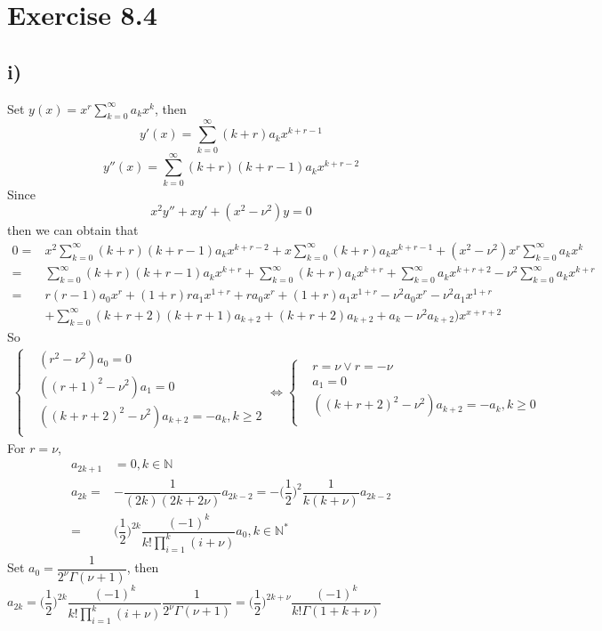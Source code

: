 \documentclass[a4paper,12pt,titlepage]{article}
\begin{document}
\section*{Exercise 8.4}
\subsection*{i)}
Set $y(x)=x^r\sum\limits_{k=0}^{\infty}a_kx^k$, then
$$y'(x)=\sum\limits_{k=0}^{\infty}(k+r)a_kx^{k+r-1}$$
$$y''(x)=\sum\limits_{k=0}^{\infty}(k+r)(k+r-1)a_kx^{k+r-2}$$
Since 
$$x^2y''+xy'+(x^2-\nu^2)y=0$$
then we can obtain that
\begin{align*}
0=&x^2\sum\limits_{k=0}^{\infty}(k+r)(k+r-1)a_kx^{k+r-2}+x\sum\limits_{k=0}^{\infty}(k+r)a_kx^{k+r-1}+(x^2-\nu^2)x^r\sum\limits_{k=0}^{\infty}a_kx^k\\
=&\sum\limits_{k=0}^{\infty}(k+r)(k+r-1)a_kx^{k+r}+\sum\limits_{k=0}^{\infty}(k+r)a_kx^{k+r}+\sum\limits_{k=0}^{\infty}a_kx^{k+r+2}-\nu^2\sum\limits_{k=0}^{\infty}a_kx^{k+r}\\
=&r(r-1)a_0x^r+(1+r)ra_1x^{1+r}+ra_0x^r+(1+r)a_1x^{1+r}-\nu^2a_0x^r-\nu^2a_1x^{1+r}\\
&+\sum\limits_{k=0}^{\infty}(k+r+2)(k+r+1)a_{k+2}+(k+r+2)a_{k+2}+a_k-\nu^2a_{k+2})x^{x+r+2}
\end{align*}
So
\begin{align*}
\left\{
\begin{aligned}
&(r^2-\nu^2)a_0=0\\
&((r+1)^2-\nu^2)a_1=0\\
&((k+r+2)^2-\nu^2)a_{k+2}=-a_k,k\geqslant2\\
\end{aligned}
\right.\Leftrightarrow\left\{
\begin{aligned}
&r=\nu\vee r=-\nu\\
&a_1=0\\
&((k+r+2)^2-\nu^2)a_{k+2}=-a_k,k\geqslant0\\
\end{aligned}
\right.
\end{align*}
For $r=\nu$,
\begin{align*}
a_{2k+1}&=0,k\in\mathbb{N}\\
a_{2k}=&-\dfrac{1}{(2k)(2k+2\nu)}a_{2k-2}=-\Big(\dfrac{1}{2}\Big)^2\dfrac{1}{k(k+\nu)}a_{2k-2}\\
=&\Big(\dfrac{1}{2}\Big)^{2k}\dfrac{(-1)^k}{k!\prod\limits_{i=1}^k(i+\nu)}a_0,k\in\mathbb{N}^*
\end{align*}
Set $a_0=\dfrac{1}{2^{\nu}\Gamma(\nu+1)}$, then $a_{2k}=\Big(\dfrac{1}{2}\Big)^{2k}\dfrac{(-1)^k}{k!\prod\limits_{i=1}^k(i+\nu)}\dfrac{1}{2^{\nu}\Gamma(\nu+1)}=\Big(\dfrac{1}{2}\Big)^{2k+\nu}\dfrac{(-1)^k}{k!\Gamma(1+k+\nu)}$
\end{document}
